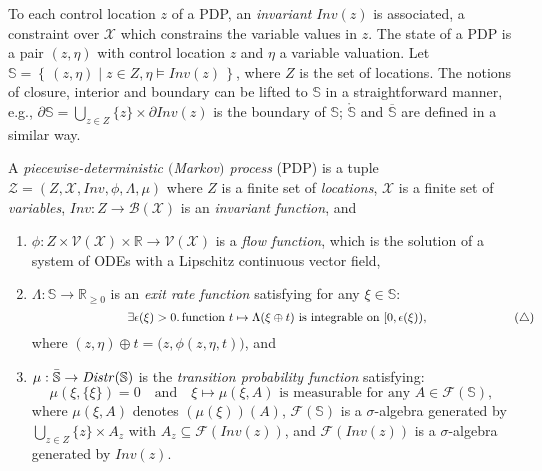 \documentclass{LMCS}
\newcommand{\mc}[1]{\mathcal{#1}}
\newcommand{\mb}{\mathbb}
\newcommand{\<}{\langle}
\renewcommand{\>}{\rangle}
\newcommand{\ges}{\geqslant}
\newcommand{\PDP}{\textsc{PDP}}
\newcommand{\Distr}{{\it Distr}}
\newcommand{\Inv}{\mathit{Inv}}
\newcommand{\Reals}{\mathbb{R}}
\begin{document}
To each control location $z$ of a PDP, an \emph{invariant} $\Inv(z)$ is associated,
a constraint over $\mc{X}$ which constrains the variable values in $z$.
The state of a PDP is a pair $(z, \eta)$ with control location $z$ and $\eta$
a variable valuation.
Let $\mb{S} = \left\{ \, (z,\eta) \mid z\in Z, \eta \models \Inv(z) \, \right\}$,
where $Z$ is the set of locations.
The notions of closure, interior and boundary can be lifted to $\mb{S}$ in
a straightforward manner, e.g., $\partial\mb{S} = \bigcup_{z\in Z} \{z\}
\times \partial \Inv(z)$ is the boundary of $\mb{S}$; $\mathring{\mb{S}}$
and $\overline{\mb{S}}$ are defined in a similar way.
\begin{defi}[\PDP\,\cite{Dav93}]
A \emph{piecewise-deterministic $($Markov$)$ process} (PDP) is a tuple $\mc{Z}
= \left(Z,\mc{X},\Inv,\phi,\Lambda,\mu\right)$ where $Z$ is a finite set of
\emph{locations}, $\mc{X}$ is a finite set of \emph{variables}, $\Inv: Z \to
\mc{B}(\mc{X})$ is an \emph{invariant function}, and
\begin{enumerate}[$\bullet$]
\item
$\phi: Z \times \mc{V}(\mc{X}) \times \Reals \to \mc{V}(\mc{X})$ is a \emph{flow
function}, which is the solution of a system of ODEs with a Lipschitz continuous vector
field,
\item
$\Lambda: \mb{S} \to \Reals_{\ges 0}$ is an \emph{exit rate function}
satisfying for any $\xi\in\mb{S}$:
$$
\ \  \hspace{2.5cm} \exists \epsilon(\xi)>0.\, \mbox{function } t\mapsto \Lambda(\xi\oplus t)
\mbox{ is integrable on } [0,\epsilon(\xi)),\hspace{2.5cm} (\triangle)
$$
where $(z,\eta)\oplus t =\big(z,\phi(z,\eta,t)\big)$,  and
\item $\mu:
\bar{\mb{S}}\rightarrow\Distr(\mb{S})$
is the \emph{transition probability function} satisfying:
$$
\mu(\xi,\{\xi\}) = 0 \quad \mbox{and} \quad
\xi\mapsto \mu(\xi,A) \mbox{ is measurable for any } A\in\mc{F}(\mb{S}),
$$
where $\mu(\xi,A)$ denotes $(\mu(\xi))(A)$, $\mc{F}(\mb{S})$ is a $\sigma$-algebra
generated by $\bigcup_{z\in Z}\{z\}\times A_z$ with $A_z \subseteq \mc{F}(\Inv(z))$, and
$\mc{F}(\Inv(z))$ is a $\sigma$-algebra generated by $\Inv(z)$.
\end{enumerate}
\end{defi}
\end{document}
